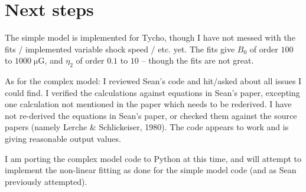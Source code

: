 \documentclass[10pt]{article}
\newcommand{\mt}{\mathrm}
\newcommand{\unit}[1]{\; \mt{#1}} %
\begin{document}
\section{Next steps}

The simple model is implemented for Tycho, though I have not messed with the
fits / implemented variable shock speed / etc. yet.  The fits give $B_0$
of order $100$ to $1000 \unit{\mu G}$, and $\eta_2$ of order $0.1$ to $10$ --
though the fits are not great.

As for the complex model: I reviewed Sean's code and hit/asked about all issues
I could find.
I verified the calculations against equations in Sean's paper, excepting one
calculation not mentioned in the paper which needs to be rederived.
I have not re-derived the equations in Sean's paper, or checked them against
the source papers (namely Lerche \& Schlickeiser, 1980).
The code appears to work and is giving reasonable output values.

I am porting the complex model code to Python at this time, and will attempt to
implement the non-linear fitting as done for the simple model code (and as Sean
previously attempted).
\end{document}
